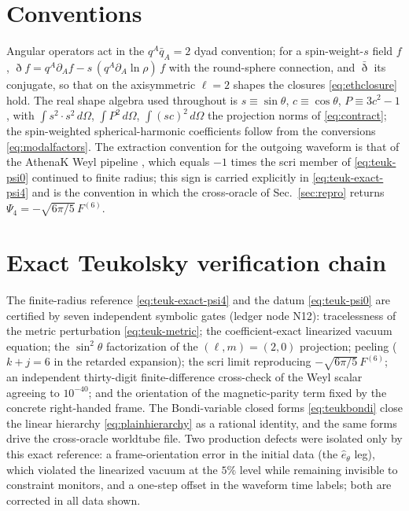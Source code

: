 \appendix

\section{Conventions}
\label{app:conventions}

Angular operators act in the $q^A\bar q_A = 2$ dyad convention; for a
spin-weight-$s$ field $f$,
$\eth f = q^A\partial_A f - s\,(q^A\partial_A\ln\rho)\,f$ with the
round-sphere connection, and $\bar\eth$ its conjugate, so that on the
axisymmetric $\ell=2$ shapes the closures \eqref{eq:ethclosure} hold.
The real shape algebra used throughout is
$s\equiv\sin\theta$, $c\equiv\cos\theta$, $P\equiv 3c^2-1$, with
$\int s^2\cdot s^2\,d\Omega$, $\int P^2\,d\Omega$, $\int (sc)^2\,d\Omega$
the projection norms of \eqref{eq:contract}; the spin-weighted
spherical-harmonic coefficients follow from the conversions
\eqref{eq:modalfactors}. The extraction convention for the outgoing
waveform is that of the AthenaK Weyl pipeline \cite{Zhu:2024utz}, which
equals $-1$ times the scri member of \eqref{eq:teuk-psi0} continued to
finite radius; this sign is carried explicitly in
\eqref{eq:teuk-exact-psi4} and is the convention in which the
cross-oracle of Sec.~\ref{sec:repro} returns
$\Psi_4 = -\sqrt{6\pi/5}\,F^{(6)}$.

\section{Exact Teukolsky verification chain}
\label{app:teuk}

The finite-radius reference \eqref{eq:teuk-exact-psi4} and the datum
\eqref{eq:teuk-psi0} are certified by seven independent symbolic gates
(ledger node N12): tracelessness of the metric perturbation
\eqref{eq:teuk-metric}; the coefficient-exact linearized vacuum equation;
the $\sin^2\theta$ factorization of the $(\ell,m)=(2,0)$ projection;
peeling ($k+j=6$ in the retarded expansion); the scri limit reproducing
$-\sqrt{6\pi/5}\,F^{(6)}$; an independent thirty-digit finite-difference
cross-check of the Weyl scalar agreeing to $10^{-40}$; and the
orientation of the magnetic-parity term fixed by the concrete
right-handed frame. The Bondi-variable closed forms \eqref{eq:teukbondi}
close the linear hierarchy \eqref{eq:plainhierarchy} as a rational
identity, and the same forms drive the cross-oracle worldtube file. Two
production defects were isolated only by this exact reference: a
frame-orientation error in the initial data (the $\hat e_\theta$ leg),
which violated the linearized vacuum at the $5\%$ level while remaining
invisible to constraint monitors, and a one-step offset in the waveform
time labels; both are corrected in all data shown.

